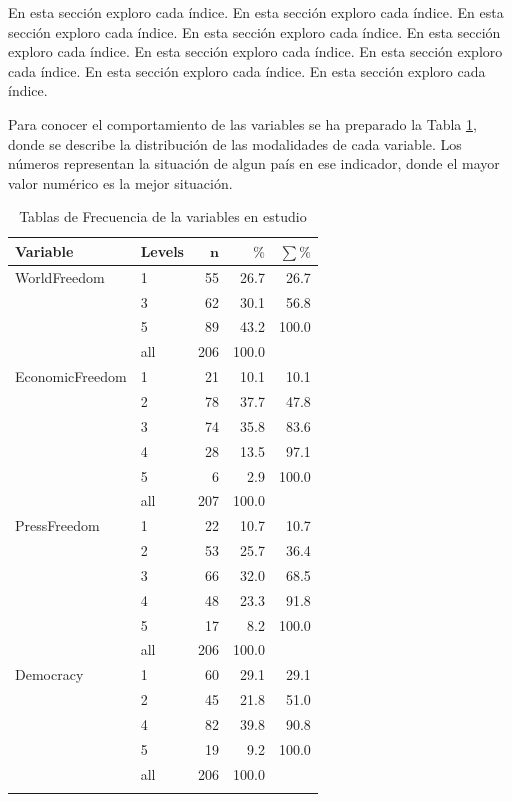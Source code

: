 \documentclass{article}
\begin{document}
En esta sección exploro cada índice. En esta sección exploro cada índice. En esta sección exploro cada índice. En esta sección exploro cada índice. En esta sección exploro cada índice. En esta sección exploro cada índice. En esta sección exploro cada índice. En esta sección exploro cada índice. En esta sección exploro cada índice.





Para conocer el comportamiento de las variables se ha preparado la Tabla \ref{Tfrecuencias}, donde se describe la distribución de las modalidades de cada variable. Los números representan la situación de algun país en ese indicador, donde el mayor valor numérico es la mejor situación.

\begingroup\normalsize
\begin{longtable}{llrrr}
\caption{Tablas de Frecuencia de la variables en estudio} \\ 
 \textbf{Variable} & \textbf{Levels} & $\mathbf{n}$ & $\mathbf{\%}$ & $\mathbf{\sum \%}$ \\ 
  \hline \hline
WorldFreedom & 1 & 55 & 26.7 & 26.7 \\ 
   & 3 & 62 & 30.1 & 56.8 \\ 
   & 5 & 89 & 43.2 & 100.0 \\ 
   \hline
 & all & 206 & 100.0 &  \\ 
   \hline
\hline
EconomicFreedom & 1 & 21 & 10.1 & 10.1 \\ 
   & 2 & 78 & 37.7 & 47.8 \\ 
   & 3 & 74 & 35.8 & 83.6 \\ 
   & 4 & 28 & 13.5 & 97.1 \\ 
   & 5 & 6 & 2.9 & 100.0 \\ 
   \hline
 & all & 207 & 100.0 &  \\ 
   \hline
\hline
PressFreedom & 1 & 22 & 10.7 & 10.7 \\ 
   & 2 & 53 & 25.7 & 36.4 \\ 
   & 3 & 66 & 32.0 & 68.5 \\ 
   & 4 & 48 & 23.3 & 91.8 \\ 
   & 5 & 17 & 8.2 & 100.0 \\ 
   \hline
 & all & 206 & 100.0 &  \\ 
   \hline
\hline
Democracy & 1 & 60 & 29.1 & 29.1 \\ 
   & 2 & 45 & 21.8 & 51.0 \\ 
   & 4 & 82 & 39.8 & 90.8 \\ 
   & 5 & 19 & 9.2 & 100.0 \\ 
   \hline
 & all & 206 & 100.0 &  \\ 
   \hline
\hline
\hline
\label{Tfrecuencias}
\end{longtable}
\endgroup
\end{document}
